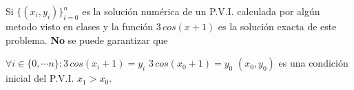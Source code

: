 \begin{pregunta}
\begin{cuerpo}
Si $\{(x_i,y_i)\}_{i=0}^n$ es la soluci\'on num\'erica de un P.V.I. calculada por alg\'un metodo visto en clases y la funci\'on $3\,cos(x+1)$ es la soluci\'on exacta de este problema. \textbf{No} se puede garantizar que
\end{cuerpo}

\begin{alternativas}
{$\forall i\in\{0,\cdots n\}: 3\, cos(x_i+1)=y_i$}
{$3\,cos(x_0+1)=y_0$}
{$(x_0,y_0)$ es una condici\'on inicial del P.V.I.}
{$x_1>x_0$.}
\end{alternativas}

\justificacion{0cm}
\end{pregunta}